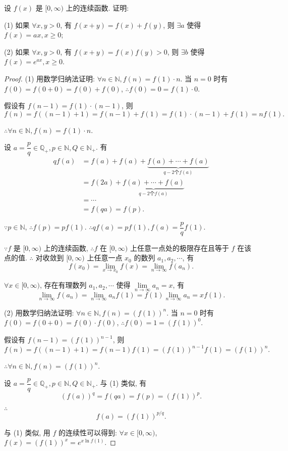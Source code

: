 \documentclass{ctexart}
\begin{document}
\begin{exercise}%
    设 $f(x)$ 是 $[0,\infty)$ 上的连续函数. 证明:

    (1) 如果 $\forall x,y>0$, 有 $f(x+y)=f(x)+f(y)$, 则 $\exists a$ 使得 $f(x)=ax,x\geq0$;

    (2) 如果 $\forall x,y>0$, 有 $f(x+y)=f(x)f(y)>0$, 则 $\exists b$ 使得 $f(x)=e^{ax},x\geq0$.
\end{exercise}
\begin{proof}
    (1) 用数学归纳法证明: $\forall n\in\mathbb{N},f(n)=f(1)\cdot n$. 当 $n=0$ 时有 $f(0)=f(0+0)=f(0)+f(0)$, $\therefore f(0)=0=f(1)\cdot0$.

    假设有 $f(n-1)=f(1)\cdot(n-1)$, 则
    \[f(n)=f((n-1)+1)=f(n-1)+f(1)=f(1)\cdot(n-1)+f(1)=nf(1).\]

    $\therefore\forall n\in\mathbb{N},f(n)=f(1)\cdot n$.

    设 $a=\dfrac{p}{q}\in\mathbb{Q}_+,p\in\mathbb{N},Q\in\mathbb{N}_+$. 有
    \begin{align*}
        qf(a) & =f(a)+f(a)+\underbrace{f(a)+\cdots+f(a)}_{q-2\text{个}f(a)} \\
        & =f(2a)+\underbrace{f(a)+\cdots+f(a)}_{q-2\text{个}f(a)} \\
        & =\cdots \\
        & =f(qa)=f(p).
    \end{align*}

    $\because p\in\mathbb{N}$, $\therefore f(p)=pf(1)$. $\therefore qf(a)=pf(1),f(a)=\dfrac{p}{q}f(1)$.

    $\because f$ 是 $[0,\infty)$ 上的连续函数, $\therefore f$ 在 $[0,\infty)$ 上任意一点处的极限存在且等于 $f$ 在该点的值. $\therefore$ 对收敛到 $[0,\infty)$ 上任意一点 $x_0$ 的数列 $a_1,a_2,\cdots$, 有
    \[f(x_0)=\lim\limits_{x\to x_0}f(x)=\lim\limits_{n\to\infty}f(a_n).\]
    
    $\forall x\in[0,\infty)$, 存在有理数列 $a_1,a_2,\cdots$ 使得 $\lim\limits_{n\to\infty}a_n=x$, 有
    \[\lim\limits_{n\to\infty}f(a_n)=\lim\limits_{n\to\infty}a_nf(1)=f(1)\lim\limits_{n\to\infty}a_n=xf(1).\]

    (2) 用数学归纳法证明: $\forall n\in\mathbb{N},f(n)=(f(1))^n$. 当 $n=0$ 时有 $f(0)=f(0+0)=f(0)\cdot f(0)$, $\therefore f(0)=1=(f(1))^0$.

    假设有 $f(n-1)=(f(1))^{n-1}$, 则
    \[f(n)=f((n-1)+1)=f(n-1)f(1)=(f(1))^{n-1}f(1)=(f(1))^n.\]

    $\therefore\forall n\in\mathbb{N},f(n)=(f(1))^n$.

    设 $a=\dfrac{p}{q}\in\mathbb{Q}_+,p\in\mathbb{N},Q\in\mathbb{N}_+$. 与 (1) 类似, 有
    \[(f(a))^q=f(qa)=f(p)=(f(1))^p.\]

    $\therefore$
    \[f(a)=(f(1))^{p/q}.\]

    与 (1) 类似, 用 $f$ 的连续性可以得到: $\forall x\in[0,\infty)$, $f(x)=(f(1))^x=e^{x\ln f(1)}$.
\end{proof}
\end{document}

